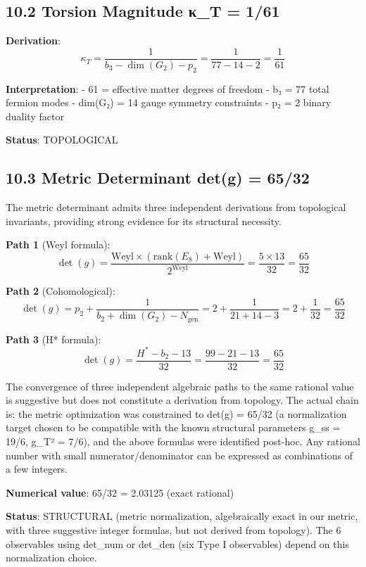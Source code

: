 \documentclass[11pt,a4paper]{article}
\begin{document}
\subsection{10.2 Torsion Magnitude κ\_\allowbreak{}T = 1/61}\label{torsion-magnitude-ux3ba_t-161}

\textbf{Derivation}: \[\kappa_T = \frac{1}{b_3 - \dim(G_2) - p_2} = \frac{1}{77 - 14 - 2} = \frac{1}{61}\]

\textbf{Interpretation}: - 61 = effective matter degrees of freedom - b₃ = 77 total fermion modes - dim(G₂) = 14 gauge symmetry constraints - p₂ = 2 binary duality factor

\textbf{Status}: TOPOLOGICAL

\subsection{10.3 Metric Determinant det(g) = 65/32}\label{metric-determinant-detg-6532}

The metric determinant admits three independent derivations from topological invariants, providing strong evidence for its structural necessity.

\textbf{Path 1} (Weyl formula): \[\det(g) = \frac{\text{Weyl} \times (\text{rank}(E_8) + \text{Weyl})}{2^{\text{Weyl}}} = \frac{5 \times 13}{32} = \frac{65}{32}\]

\textbf{Path 2} (Cohomological): \[\det(g) = p_2 + \frac{1}{b_2 + \dim(G_2) - N_{\text{gen}}} = 2 + \frac{1}{21+14-3} = 2 + \frac{1}{32} = \frac{65}{32}\]

\textbf{Path 3} (H* formula): \[\det(g) = \frac{H^* - b_2 - 13}{32} = \frac{99 - 21 - 13}{32} = \frac{65}{32}\]

The convergence of three independent algebraic paths to the same rational value is suggestive but does not constitute a derivation from topology. The actual chain is: the metric optimization was constrained to det(g) = 65/32 (a normalization target chosen to be compatible with the known structural parameters g\_\allowbreak{}ss = 19/6, g\_\allowbreak{}T² = 7/6), and the above formulas were identified post-hoc. Any rational number with small numerator/denominator can be expressed as combinations of a few integers.

\textbf{Numerical value}: 65/32 = 2.03125 (exact rational)

\textbf{Status}: STRUCTURAL (metric normalization, algebraically exact in our metric, with three suggestive integer formulas, but not derived from topology). The 6 observables using det\_\allowbreak{}num or det\_\allowbreak{}den (six Type I observables) depend on this normalization choice.
\end{document}
